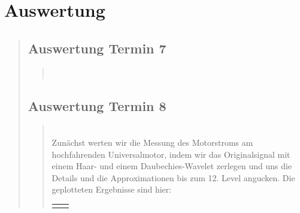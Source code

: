 \section{Auswertung}
\begin{quote}
    \subsection{Auswertung Termin 7}
    \begin{quote}
         \\
    \end{quote}  %

    \subsection{Auswertung Termin 8}
    \begin{quote}
         \\
        
        Zunächst werten wir die Messung des Motorstroms am hochfahrenden
        Universalmotor, indem wir das Originalsignal mit einem Haar- und einem
        Daubechies-Wavelet zerlegen und uns die Details und die Approximationen
        bis zum 12. Level angucken. Die geplotteten Ergebnisse sind hier:
        
         \begin{center}
                \begin{tabular}{ll}
    
                \hspace{-8em}
                    \begin{minipage}{0.6\textwidth}
    

\end{minipage}
\end{tabular}
\end{center}
\end{quote}
\end{quote}
